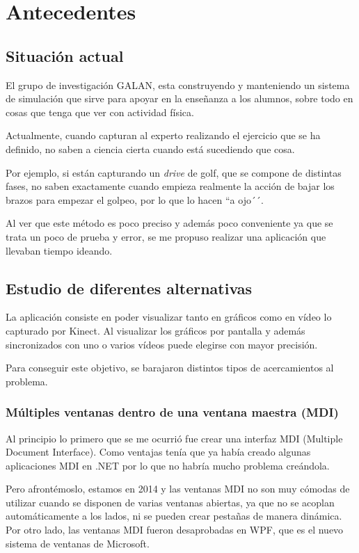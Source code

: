 \chapter{Antecedentes}

\section{Situaci\'on actual}
El grupo de investigaci\'on GALAN, esta construyendo y manteniendo un sistema de simulaci\'on que sirve para
apoyar en la ense\~nanza a los alumnos, sobre todo en cosas que tenga que ver con actividad f\'isica.

Actualmente, cuando capturan al experto realizando el ejercicio que se ha definido, no saben a ciencia cierta
cuando est\'a sucediendo que cosa.

Por ejemplo, si est\'an capturando un \emph{drive} de golf, que se compone de distintas fases, no saben exactamente
cuando empieza realmente la acci\'on de bajar los brazos para empezar el golpeo, por lo que lo hacen ``a ojo´´.

Al ver que este m\'etodo es poco preciso y adem\'as poco conveniente ya que se trata un poco de prueba y error,
se me propuso realizar una aplicaci\'on que llevaban tiempo ideando.

\section{Estudio de diferentes alternativas}
La aplicaci\'on consiste en poder visualizar tanto en gr\'aficos como en v\'ideo lo capturado por Kinect. Al visualizar
los gr\'aficos por pantalla y adem\'as sincronizados con uno o varios v\'ideos puede elegirse con mayor precisi\'on.

Para conseguir este objetivo, se barajaron distintos tipos de acercamientos al problema.

\subsection{M\'ultiples ventanas dentro de una ventana maestra (MDI)}
Al principio lo primero que se me ocurri\'o fue crear una interfaz MDI (Multiple Document Interface). Como ventajas
ten\'ia que ya hab\'ia creado algunas aplicaciones MDI en .NET por lo que no habr\'ia mucho problema cre\'andola.

Pero afront\'emoslo, estamos en 2014 y las ventanas MDI no son muy c\'omodas de utilizar cuando se disponen de varias ventanas
abiertas, ya que no se acoplan autom\'aticamente a los lados, ni se pueden crear pesta\~nas de manera din\'amica.
Por otro lado, las ventanas MDI fueron desaprobadas en WPF, que es el nuevo sistema de ventanas de Microsoft.

